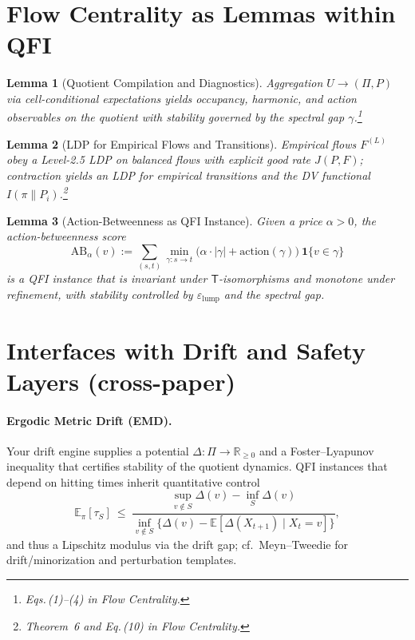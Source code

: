 \documentclass[11pt]{article}
\newcommand{\EE}{\mathbb{E}}
\newcommand{\1}{\mathbf{1}}
\newtheorem{lemma}{Lemma}
\begin{document}
\section{Flow Centrality as Lemmas within QFI}\label{sec:flowlemmas}
\begin{lemma}[Quotient Compilation and Diagnostics]
Aggregation $U\to(\Pi,P)$ via cell-conditional expectations yields occupancy, harmonic, and action observables on the quotient with stability governed by the spectral gap $\gamma$\cite{Chung1997}.\footnote{Eqs.\,(1)–(4) in Flow Centrality. }
\end{lemma}

\begin{lemma}[LDP for Empirical Flows and Transitions]
Empirical flows $F^{(L)}$ obey a Level-2.5 LDP\cite{BertiniFaggionatoGabrielli2015,DemboZeitouni1998,DonskerVaradhan1975I} on balanced flows with explicit good rate $J(P,F)$; contraction yields an LDP for empirical transitions and the DV functional $I(\pi\|P_i)$.\footnote{Theorem~6 and Eq.\,(10) in Flow Centrality. }
\end{lemma}

\begin{lemma}[Action-Betweenness as QFI Instance]
Given a price $\alpha>0$, the action-betweenness\cite{Freeman1977} score
\[
\mathrm{AB}_\alpha(v):=\sum_{(s,t)} \min_{\gamma:s\to t} \big(\alpha\cdot |\gamma| + \text{action}(\gamma)\big)\ \mathbf 1\{v\in\gamma\}
\]
is a QFI instance that is invariant under $\mathsf T$-isomorphisms and monotone under refinement, with stability controlled by $\varepsilon_{\text{lump}}$ and the spectral gap.
\end{lemma}

\section{Interfaces with Drift and Safety Layers (cross-paper)}
\paragraph{Ergodic Metric Drift (EMD).}
Your drift engine supplies a potential $\Delta:\Pi\to\mathbb{R}_{\ge 0}$ and a Foster–Lyapunov inequality that certifies stability of the quotient dynamics.
QFI instances that depend on hitting times inherit quantitative control
\[
\EE_\pi[\tau_S]\ \le\ \frac{\sup_{v\notin S}\Delta(v)-\inf_{S}\Delta(v)}{\inf_{v\notin S}\{\Delta(v)-\EE[\Delta(X_{t+1})\mid X_t=v]\}},
\]
and thus a Lipschitz modulus via the drift gap; cf.\ Meyn–Tweedie\cite{MeynTweedie} for drift/minorization and perturbation templates. %
\end{document}
